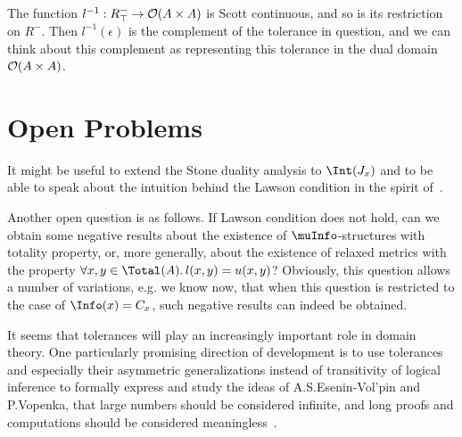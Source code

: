 The function $l^{-1} : R^{-}_{\top} \rightarrow {\cal O} (A \times A)$
is Scott continuous, and so is its restriction on $R^{-}$.
Then $l^{-1} (\epsilon)$ is the complement of the tolerance in
question, and we can think about this complement as representing
this tolerance in the dual domain ${\cal O} (A \times A)$.
 
\section{Open Problems}

It might be useful to extend the Stone duality analysis to
$\Int(J_x)$ and to be able to speak about the intuition behind
the Lawson condition in the spirit of~\cite{Smyth}.

Another open question is as follows.
If Lawson condition does not hold, can we obtain some negative
results about the existence of $\muInfo$-structures
with totality property, or, more generally,
about the existence of relaxed metrics
with the property $\forall x,y \in \Total(A).\,l(x,y) = u(x,y)$?
Obviously, this question allows a number of variations,
e.g. we know now, that when this
 question is restricted to the case of $\Info(x) = C_x$,
such negative results can indeed be obtained.

It seems that tolerances will play an increasingly important role
in domain theory. One particularly promising direction of development
is to use tolerances and especially their asymmetric generalizations
instead of transitivity of logical inference to formally
express and study the ideas of A.S.Esenin-Vol'pin and P.Vopenka,
that large numbers should be considered infinite,
and long proofs and computations should be considered 
meaningless~\cite{Vopenka}.


